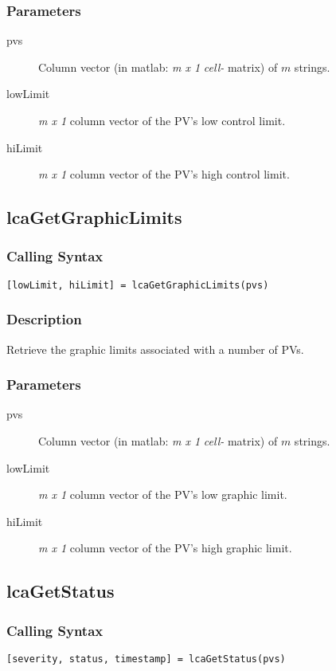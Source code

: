 \documentclass{article}
\newcommand{\pbrk}{\pagebreak[3]}
\newcommand{\ita}[1]{\emph{#1}}
\newcommand{\m}{$m$}
\newcommand{\mhack}{$m$} %
\newcommand{\mxl}{$m\times 1$}
\renewcommand{\m}{\ita{m}}
\newcommand{\mhack}{\ita{m}} %
\renewcommand{\mxl}{\ita{m x 1}}
\renewcommand{\pbrk}{}
\newcommand{\PVITEM}{
\item[pvs] Column vector (in matlab: \mxl{} \ita{cell-} matrix)
of \mhack{} strings.
}
\begin{document}
\subsubsection{Parameters}
\begin{description}
\PVITEM
\item[lowLimit] \mxl{} column vector of the PV's low control limit.
\item[hiLimit]  \mxl{} column vector of the PV's high control limit.
\end{description}


\vspace*{\fill}
\pbrk
\subsection{lcaGetGraphicLimits}
\subsubsection{Calling Syntax}
\begin{verbatim}
[lowLimit, hiLimit] = lcaGetGraphicLimits(pvs)
\end{verbatim}
\subsubsection{Description}
Retrieve the graphic limits associated with a number of PVs.
\subsubsection{Parameters}
\begin{description}
\PVITEM
\item[lowLimit] \mxl{} column vector of the PV's low graphic limit.
\item[hiLimit]  \mxl{} column vector of the PV's high graphic limit.
\end{description}

\vspace*{\fill}
\pbrk
\subsection{lcaGetStatus}
\subsubsection{Calling Syntax}
\begin{verbatim}
[severity, status, timestamp] = lcaGetStatus(pvs)
\end{verbatim}
\end{document}
